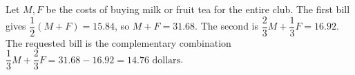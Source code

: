 Let $M,F$ be the costs of buying milk or fruit tea for the entire club. The first bill gives $\dfrac{1}{2}(M+F)=15.84$, so $M+F=31.68$. The second is $\dfrac{2}{3}M+\dfrac{1}{3}F=16.92$. The requested bill is the complementary combination $\dfrac{1}{3}M+\dfrac{2}{3}F=31.68-16.92=\boxed{14.76\text{ dollars}}$.
